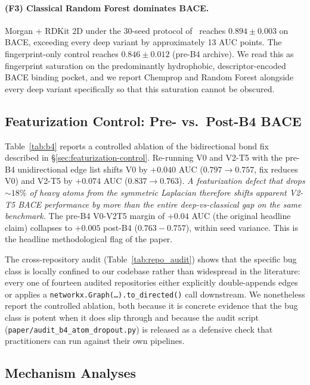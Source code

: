 \paragraph{(F3) Classical Random Forest dominates BACE.} Morgan + RDKit
2D under the 30-seed protocol of~\cite{deng2023systematic} reaches
$0.894 \pm 0.003$ on BACE, exceeding every deep variant by approximately
13 AUC points. The fingerprint-only control reaches $0.846 \pm 0.012$
(pre-B4 archive). We read this as fingerprint saturation on the
predominantly hydrophobic, descriptor-encoded BACE binding pocket, and we
report Chemprop and Random Forest alongside every deep variant
specifically so that this saturation cannot be obscured.

\subsection{Featurization Control: Pre- vs.\ Post-B4 BACE}
\label{sec:b4-control}

Table~\ref{tab:b4} reports a controlled ablation of the bidirectional
bond fix described in \S\ref{sec:featurization-control}. Re-running V0
and V2-T5 with the pre-B4 unidirectional edge list shifts V0 by
$+0.040$ AUC ($0.797 \to 0.757$, fix reduces V0) and V2-T5 by $+0.074$
AUC ($0.837 \to 0.763$). \emph{A featurization defect that drops
$\sim 18\%$ of heavy atoms from the symmetric Laplacian therefore shifts
apparent V2-T5 BACE performance by more than the entire deep-vs-classical
gap on the same benchmark.} The pre-B4 V0-V2T5 margin of $+0.04$ AUC
(the original headline claim) collapses to $+0.005$ post-B4
($0.763 - 0.757$), within seed variance. This is the headline
methodological flag of the paper.

The cross-repository audit (Table~\ref{tab:repo_audit}) shows that the
specific bug class is locally confined to our codebase rather than
widespread in the literature: every one of fourteen audited repositories
either explicitly double-appends edges or applies a
\texttt{networkx.Graph(\ldots).to\_directed()} call downstream. We
nonetheless report the controlled ablation, both because it is concrete
evidence that the bug class is potent when it does slip through and
because the audit script (\texttt{paper/audit\_b4\_atom\_dropout.py}) is
released as a defensive check that practitioners can run against their
own pipelines.

\subsection{Mechanism Analyses}
\label{sec:mechanism}

